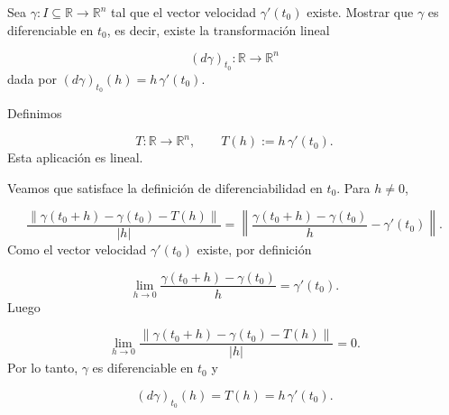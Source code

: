 \begin{bookexercise}{}
Sea $\gamma:I\subseteq \mathbb{R}\to \mathbb{R}^n$ tal que el vector velocidad $\gamma'(t_0)$ existe. Mostrar que $\gamma$ es diferenciable en $t_0$, es decir, existe la transformación lineal

\[
(d\gamma)_{t_0}:\mathbb{R}\to \mathbb{R}^n
\]
dada por $(d\gamma)_{t_0}(h)=h\,\gamma'(t_0)$.

\end{bookexercise}
\begin{bookproof}{}
Definimos

\[
T:\mathbb{R}\to \mathbb{R}^n,
\qquad
T(h):=h\,\gamma'(t_0).
\]
Esta aplicación es lineal.

Veamos que satisface la definición de diferenciabilidad en $t_0$. Para $h\neq 0$,

\[
\frac{\|\gamma(t_0+h)-\gamma(t_0)-T(h)\|}{|h|}
=
\left\|\frac{\gamma(t_0+h)-\gamma(t_0)}{h}-\gamma'(t_0)\right\|.
\]
Como el vector velocidad $\gamma'(t_0)$ existe, por definición

\[
\lim_{h\to 0}\frac{\gamma(t_0+h)-\gamma(t_0)}{h}
=
\gamma'(t_0).
\]
Luego

\[
\lim_{h\to 0}\frac{\|\gamma(t_0+h)-\gamma(t_0)-T(h)\|}{|h|}=0.
\]
Por lo tanto, $\gamma$ es diferenciable en $t_0$ y

\[
(d\gamma)_{t_0}(h)=T(h)=h\,\gamma'(t_0).
\]
\bookqed
\end{bookproof}
